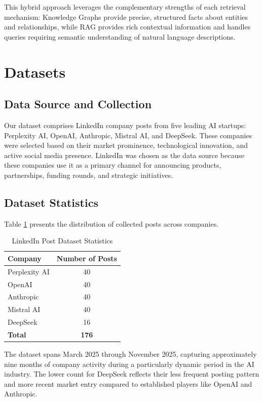 \documentclass[11pt,twocolumn]{article}
\begin{document}
This hybrid approach leverages the complementary strengths of each retrieval mechanism: Knowledge Graphs provide precise, structured facts about entities and relationships, while RAG provides rich contextual information and handles queries requiring semantic understanding of natural language descriptions.

\section{Datasets}

\subsection{Data Source and Collection}

Our dataset comprises LinkedIn company posts from five leading AI startups: Perplexity AI, OpenAI, Anthropic, Mistral AI, and DeepSeek. These companies were selected based on their market prominence, technological innovation, and active social media presence. LinkedIn was chosen as the data source because these companies use it as a primary channel for announcing products, partnerships, funding rounds, and strategic initiatives.

\subsection{Dataset Statistics}

Table \ref{tab:dataset} presents the distribution of collected posts across companies.

\begin{table}[h]
\centering
\caption{LinkedIn Post Dataset Statistics}
\label{tab:dataset}
\begin{tabular}{lc}
\toprule
\textbf{Company} & \textbf{Number of Posts} \\
\midrule
Perplexity AI & 40 \\
OpenAI & 40 \\
Anthropic & 40 \\
Mistral AI & 40 \\
DeepSeek & 16 \\
\midrule
\textbf{Total} & \textbf{176} \\
\bottomrule
\end{tabular}
\end{table}

The dataset spans March 2025 through November 2025, capturing approximately nine months of company activity during a particularly dynamic period in the AI industry. The lower count for DeepSeek reflects their less frequent posting pattern and more recent market entry compared to established players like OpenAI and Anthropic.
\end{document}
